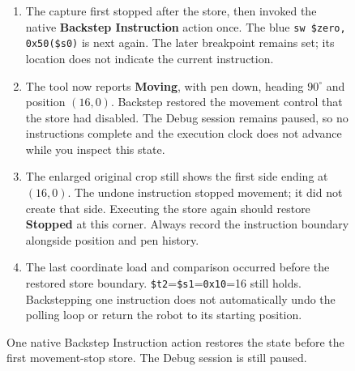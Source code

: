 \begin{figure}[htbp]
  \par\smallskip
  \begin{minipage}{\linewidth}
    \small
    \begin{enumerate}
      \item The capture first stopped after the store, then invoked the native \textbf{Backstep Instruction} action once. The blue \texttt{sw \$zero, 0x50(\$s0)} is next again. The later breakpoint remains set; its location does not indicate the current instruction.
      \item The tool now reports \textbf{Moving}, with pen down, heading $90^\circ$ and position $(16,0)$. Backstep restored the movement control that the store had disabled. The Debug session remains paused, so no instructions complete and the execution clock does not advance while you inspect this state.
      \item The enlarged original crop still shows the first side ending at $(16,0)$. The undone instruction stopped movement; it did not create that side. Executing the store again should restore \textbf{Stopped} at this corner. Always record the instruction boundary alongside position and pen history.
      \item The last coordinate load and comparison occurred before the restored store boundary. \texttt{\$t2}=\texttt{\$s1}=\texttt{0x10}=16 still holds. Backstepping one instruction does not automatically undo the polling loop or return the robot to its starting position.
    \end{enumerate}
  \end{minipage}
  \caption{One native Backstep Instruction action restores the state before the first movement-stop store. The Debug session is still paused.}
  \label{capture:006-marsbot-square-f04-paused}
\end{figure}
\par

